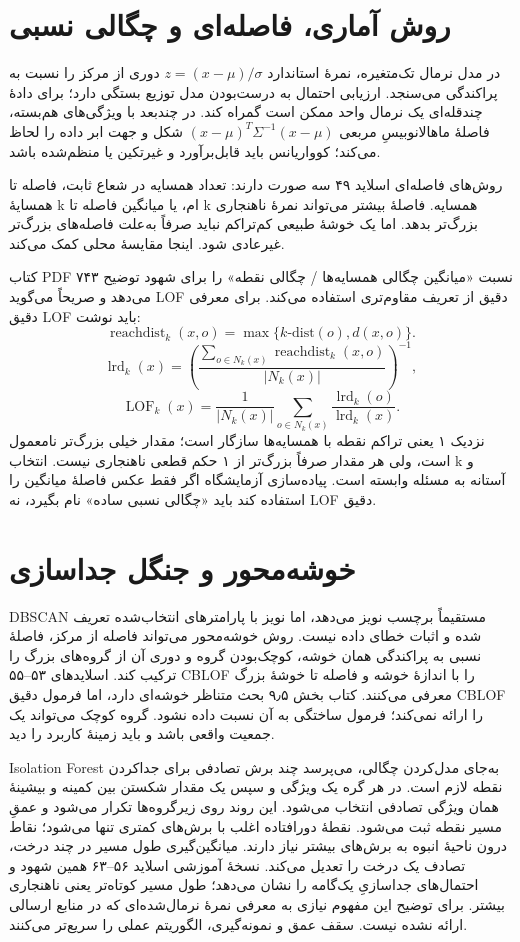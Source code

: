 \section{روش آماری، فاصله‌ای و چگالی نسبی}

در مدل نرمال تک‌متغیره، نمرهٔ استاندارد \(z=(x-\mu)/\sigma\) دوری از مرکز را نسبت به پراکندگی می‌سنجد. ارزیابی احتمال به درست‌بودن مدل توزیع بستگی دارد؛ برای دادهٔ چندقله‌ای یک نرمال واحد ممکن است گمراه کند. در چندبعد با ویژگی‌های هم‌بسته، فاصلهٔ ماهالانوبیسِ مربعی \((x-\mu)^T\Sigma^{-1}(x-\mu)\) شکل و جهت ابر داده را لحاظ می‌کند؛ کوواریانس باید قابل‌برآورد و غیرتکین یا منظم‌شده باشد.

روش‌های فاصله‌ای اسلاید ۴۹ سه صورت دارند: تعداد همسایه در شعاع ثابت، فاصله تا همسایهٔ k ام، یا میانگین فاصله تا k همسایه. فاصلهٔ بیشتر می‌تواند نمرهٔ ناهنجاری بزرگ‌تر بدهد. اما یک خوشهٔ طبیعی کم‌تراکم نباید صرفاً به‌علت فاصله‌های بزرگ‌تر غیرعادی شود. اینجا مقایسهٔ محلی کمک می‌کند.

کتاب PDF ۷۴۳ نسبت «میانگین چگالی همسایه‌ها / چگالی نقطه» را برای شهود توضیح می‌دهد و صریحاً می‌گوید LOF دقیق از تعریف مقاوم‌تری استفاده می‌کند. برای معرفی دقیق LOF باید نوشت: \[
\operatorname{reachdist}_k(x,o)=\max\{k\text{-dist}(o),d(x,o)\}.
\] \[
\operatorname{lrd}_k(x)=\left(\frac{\sum_{o\in N_k(x)}\operatorname{reachdist}_k(x,o)}{|N_k(x)|}\right)^{-1},
\] \[
\operatorname{LOF}_k(x)=\frac{1}{|N_k(x)|}\sum_{o\in N_k(x)}\frac{\operatorname{lrd}_k(o)}{\operatorname{lrd}_k(x)}.
\] نزدیک ۱ یعنی تراکم نقطه با همسایه‌ها سازگار است؛ مقدار خیلی بزرگ‌تر نامعمول است، ولی هر مقدار صرفاً بزرگ‌تر از ۱ حکم قطعی ناهنجاری نیست. انتخاب k و آستانه به مسئله وابسته است. پیاده‌سازی آزمایشگاه اگر فقط عکس فاصلهٔ میانگین را استفاده کند باید «چگالی نسبی ساده» نام بگیرد، نه LOF دقیق.

\section{خوشه‌محور و جنگل جداسازی}

DBSCAN مستقیماً برچسب نویز می‌دهد، اما نویز با پارامترهای انتخاب‌شده تعریف شده و اثبات خطای داده نیست. روش خوشه‌محور می‌تواند فاصله از مرکز، فاصلهٔ نسبی به پراکندگی همان خوشه، کوچک‌بودن گروه و دوری آن از گروه‌های بزرگ را ترکیب کند. اسلایدهای ۵۳--۵۵ CBLOF را با اندازهٔ خوشه و فاصله تا خوشهٔ بزرگ معرفی می‌کنند. کتاب بخش ۹٫۵ بحث متناظر خوشه‌ای دارد، اما فرمول دقیق CBLOF را ارائه نمی‌کند؛ فرمول ساختگی به آن نسبت داده نشود. گروه کوچک می‌تواند یک جمعیت واقعی باشد و باید زمینهٔ کاربرد را دید.

Isolation Forest به‌جای مدل‌کردن چگالی، می‌پرسد چند برش تصادفی برای جداکردن نقطه لازم است. در هر گره یک ویژگی و سپس یک مقدار شکستن بین کمینه و بیشینهٔ همان ویژگی تصادفی انتخاب می‌شود. این روند روی زیرگروه‌ها تکرار می‌شود و عمقِ مسیر نقطه ثبت می‌شود. نقطهٔ دورافتاده اغلب با برش‌های کمتری تنها می‌شود؛ نقاط درون ناحیهٔ انبوه به برش‌های بیشتر نیاز دارند. میانگین‌گیری طول مسیر در چند درخت، تصادف یک درخت را تعدیل می‌کند. نسخهٔ آموزشی اسلاید ۵۶--۶۳ همین شهود و احتمال‌های جداسازیِ یک‌گامه را نشان می‌دهد؛ طول مسیر کوتاه‌تر یعنی ناهنجاری بیشتر. برای توضیح این مفهوم نیازی به معرفی نمرهٔ نرمال‌شده‌ای که در منابع ارسالی ارائه نشده نیست. سقف عمق و نمونه‌گیری، الگوریتم عملی را سریع‌تر می‌کنند.
